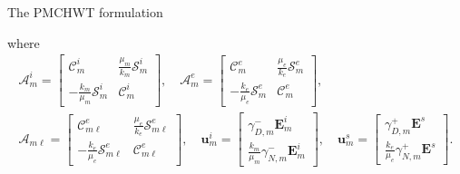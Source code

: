 \documentclass[12pt]{beamer}
\begin{document}
\begin{frame}{The PMCHWT formulation}
\begin{scriptsize}
    where
\begin{gather}
\bm{\mathcal{{A}}}^i_m = \begin{bmatrix}
\mathcal{C}^i_m & \frac{\mu_m}{k_m} \mathcal{S}^i_m \\[6pt]
-\frac{k_m}{\mu_m} \mathcal{S}^i_m & \mathcal{C}^i_m
\end{bmatrix}, \quad 
\bm{\mathcal{{A}}}^e_m = \begin{bmatrix}
\mathcal{C}^e_m & \frac{\mu_e}{k_e} \mathcal{S}^e_m \\[6pt]
-\frac{k_e}{\mu_e} \mathcal{S}^e_m & \mathcal{C}^e_m
\end{bmatrix}, \nonumber \\
\bm{\mathcal{{A}}}_{m\ell} = \begin{bmatrix}
    \mathcal{C}^e_{m\ell} & \frac{\mu_e}{k_e} \mathcal{S}^e_{m\ell} \\[6pt]
    -\frac{k_e}{\mu_e} \mathcal{S}^e_{m\ell} & \mathcal{C}^e_{m\ell}
\end{bmatrix}, \quad
%
{\mathbf{u}}^i_m = \begin{bmatrix}
    \gamma_{D,m}^{-} \mathbf{E}^i_m \\[6pt]
    \frac{k_m}{\mu_m} \gamma_{N,m}^- \mathbf{E}^i_m
\end{bmatrix}, \quad 
%
{\mathbf{u}}^s_m = \begin{bmatrix}
    \gamma_{D,m}^+ \mathbf{E}^s \\[6pt]
    \frac{k_e}{\mu_e} \gamma_{N,m}^+ \mathbf{E}^s
\end{bmatrix} \nonumber .
\end{gather}
\end{scriptsize}
\end{frame}
\end{document}
